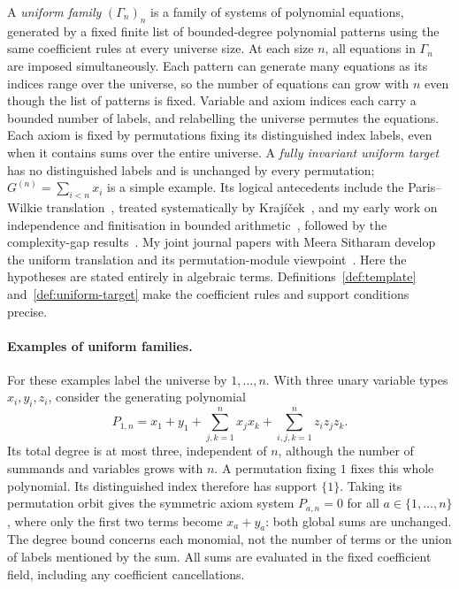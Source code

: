 \documentclass[11pt,a4paper]{article}
\theoremstyle{definition}\newtheorem{definition}[theorem]{Definition}
\theoremstyle{remark}\newtheorem{remark}[theorem]{Remark}
\begin{document}
A \emph{uniform family} $(\Gamma_n)_n$ is a family of systems of
polynomial equations, generated by a fixed finite list of bounded-degree
polynomial patterns using the same coefficient rules at every universe
size. At each size $n$, all equations in $\Gamma_n$ are imposed
simultaneously. Each pattern can generate many equations as its indices
range over the universe, so the number of equations can grow with $n$
even though the list of patterns is fixed.
Variable and axiom indices each carry a bounded number of labels,
and relabelling the universe permutes the equations. Each axiom is fixed
by permutations fixing its distinguished index labels, even when it
contains sums over the entire universe. A \emph{fully invariant uniform
target} has no distinguished labels and is unchanged by every
permutation; $G^{(n)}=\sum_{i<n}x_i$ is a simple example. Its logical
antecedents include the Paris--Wilkie translation~\cite{ParisWilkie},
treated systematically by Kraj\'{i}\v{c}ek~\cite[Chapter~9]{KrajBounded},
and my early work on independence and finitisation in bounded
arithmetic~\cite{RiisThesis,RiisFinitisation}, followed by the
complexity-gap results~\cite{RiisTree,Riis}. My joint journal papers
with Meera Sitharam develop the uniform translation and its
permutation-module viewpoint~\cite{RiisSitharamTautologies,RiisSitharamModules}.
Here the hypotheses are stated entirely in algebraic terms. Definitions~\ref{def:template}
and~\ref{def:uniform-target} make the coefficient rules and support
conditions precise.

\paragraph{Examples of uniform families.}
For these examples label the universe by $1,\ldots,n$. With three
unary variable types $x_i,y_i,z_i$, consider the generating polynomial
\[
 P_{1,n}=x_1+y_1+\sum_{j,k=1}^{n}x_jx_k+
                       \sum_{i,j,k=1}^{n}z_i z_j z_k.
\]
Its total degree is at most three, independent of $n$, although the
number of summands and variables grows with $n$. A permutation fixing
$1$ fixes this whole polynomial. Its distinguished index therefore has
support $\{1\}$. Taking its permutation orbit gives the symmetric axiom
system $P_{a,n}=0$ for all $a\in\{1,\ldots,n\}$, where only the first
two terms become $x_a+y_a$: both global sums are unchanged.
The degree bound concerns each monomial, not the number of terms or
the union of labels mentioned by the sum. All sums are evaluated in
the fixed coefficient field, including any coefficient cancellations.
\end{document}
